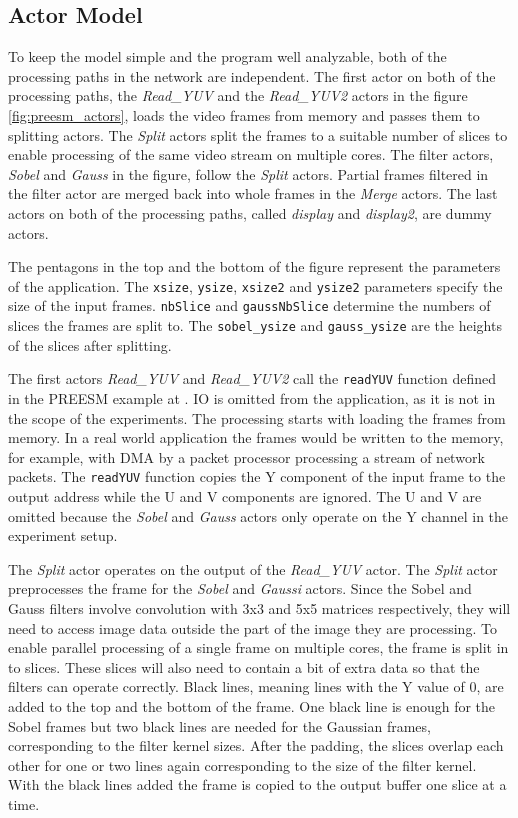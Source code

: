 \subsection{Actor Model}
\label{subsec:actors}
To keep the model simple and the program well analyzable, both of the processing paths in the network are independent. The first actor on both of the processing paths, the \textit{Read\_YUV} and the \textit{Read\_YUV2} actors in the figure \ref{fig:preesm_actors}, loads the video frames from memory and passes them to splitting actors. The \textit{Split} actors split the frames to a suitable number of slices to enable processing of the same video stream on multiple cores. The filter actors, \textit{Sobel} and \textit{Gauss} in the figure, follow the \textit{Split} actors. Partial frames filtered in the filter actor are merged back into whole frames in the \textit{Merge} actors. The last actors on both of the processing paths, called \textit{display} and \textit{display2}, are dummy actors.

The pentagons in the top and the bottom of the figure represent the parameters of the application. The \texttt{xsize}, \texttt{ysize}, \texttt{xsize2} and \texttt{ysize2} parameters specify the size of the input frames. \texttt{nbSlice} and \texttt{gaussNbSlice} determine the numbers of slices the frames are split to. The \texttt{sobel\_ysize} and \texttt{gauss\_ysize} are the heights of the slices after splitting.

The first actors \textit{Read\_YUV} and \textit{Read\_YUV2} call the \texttt{readYUV} function defined in the PREESM example at \cite{preesmtut}. IO is omitted from the application, as it is not in the scope of the experiments. The processing starts with loading the frames from memory. In a real world application the frames would be written to the memory, for example, with DMA by a packet processor processing a stream of network packets. The \texttt{readYUV} function copies the Y component of the input frame to the output address while the U and V components are ignored. The U and V are omitted because the \textit{Sobel} and \textit{Gauss} actors only operate on the Y channel in the experiment setup.

The \textit{Split} actor operates on the output of the \textit{Read\_YUV} actor. The \textit{Split} actor preprocesses the frame for the \textit{Sobel} and \textit{Gaussi} actors. Since the Sobel and Gauss filters involve convolution with 3x3 and 5x5 matrices respectively, they will need to access image data outside the part of the image they are processing. To enable parallel processing of a single frame on multiple cores, the frame is split in to slices. These slices will also need to contain a bit of extra data so that the filters can operate correctly. Black lines, meaning lines with the Y value of 0, are added to the top and the bottom of the frame. One black line is enough for the Sobel frames but two black lines are needed for the Gaussian frames, corresponding to the filter kernel sizes. After the padding, the slices overlap each other for one or two lines again corresponding to the size of the filter kernel. With the black lines added the frame is copied to the output buffer one slice at a time.

